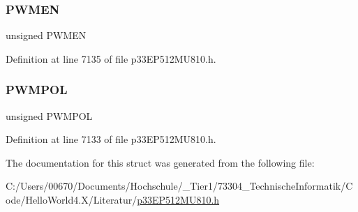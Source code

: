 \subsubsection{\texorpdfstring{P\+W\+M\+EN}{PWMEN}}
{\footnotesize\ttfamily unsigned P\+W\+M\+EN}



Definition at line 7135 of file p33\+E\+P512\+M\+U810.\+h.

\mbox{\label{structtag_u1_p_w_m_c_o_n_b_i_t_s_aa9e45e31f22290a2256cb65910dc9f19}} 
\subsubsection{\texorpdfstring{P\+W\+M\+P\+OL}{PWMPOL}}
{\footnotesize\ttfamily unsigned P\+W\+M\+P\+OL}



Definition at line 7133 of file p33\+E\+P512\+M\+U810.\+h.



The documentation for this struct was generated from the following file\+:\begin{DoxyCompactItemize}
\item 
C\+:/\+Users/00670/\+Documents/\+Hochschule/\+\_\+\+Tier1/73304\+\_\+\+Technische\+Informatik/\+Code/\+Hello\+World4.\+X/\+Literatur/\hyperlink{p33_e_p512_m_u810_8h}{p33\+E\+P512\+M\+U810.\+h}\end{DoxyCompactItemize}
